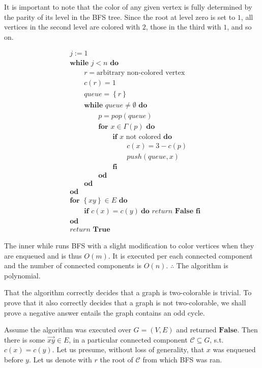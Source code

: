 It is important to note that the color of any given vertex is fully determined
by the parity of its level in the BFS tree. Since the root at level zero is set
to $1$, all vertices in the second level are colored with $2$, those in the
third with $1$, and so on.

\begin{align*}
    &j := 1\\
    &\textbf{while } j < n \textbf{ do } \\
    &\qquad r = \text{arbitrary non-colored vertex} \\ 
    &\qquad c(r) = 1 \\ 
    &\qquad queue = \left\{ r \right\} \\ 
    & \qquad\textbf{while } queue \neq \emptyset \textbf{ do } \\ 
    & \qquad \qquad p = pop(queue) \\ 
    &\qquad\qquad \textbf{for } x \in \Gamma(p) \textbf{ do } \\ 
    & \qquad \qquad \qquad \textbf{if } x \text{ not colored} \textbf{ do} \\ 
    &\qquad \qquad \qquad \qquad c(x) = 3 - c(p)\\ 
    &\qquad \qquad \qquad \qquad push(queue, x)\\
    &\qquad\qquad\qquad\textbf{fi}\\
    &\qquad\qquad \textbf{od}\\ 
    &\qquad\textbf{od}\\
    &\textbf{od}\\
    &\textbf{for } \left\{ x y \right\}  \in E \textbf{ do } \\ 
    &\qquad \textbf{if } c(x) = c(y) ~  \textbf{do } return \textbf{ False fi} \\ 
    &\textbf{od}\\
    &return \textbf{ True}
\end{align*}

The inner while runs BFS with a slight modification to color vertices when they
are enqueued and is thus $O(m)$. It is executed per each connected component
and the number of connected components is $O(n)$. $\therefore $ The algorithm 
is polynomial. 

That the algorithm correctly decides that a graph is two-colorable is trivial.
To prove that it also correctly decides that a graph is not two-colorable, we
shall prove a negative answer entails the graph contains an odd cycle.

Assume the algorithm was executed over $G = (V, E)$ and returned
$\textbf{False}$. Then there is some $\overrightarrow{xy} \in E$, in a
particular connected component $\mathcal{C} \subseteq G$, s.t.
$c(x) = c(y)$. Let us presume, without loss of generality, that 
$x$ was enqueued before $y$. Let us denote with $r$ the root 
of $\mathcal{C}$ from which BFS was ran.

